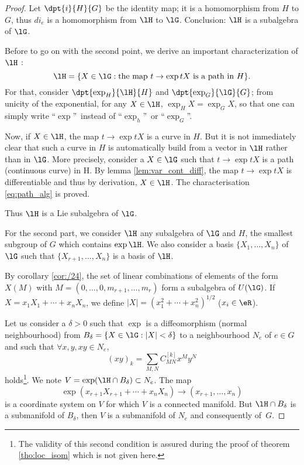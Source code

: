 \begin{proof}

Let $\dpt{i}{H}{G}$ be the identity map; it is a homomorphism from $H$ to $G$, thus $di_e$ is a homomorphism from $\lH$ to $\lG$. Conclusion: $\lH$ is a subalgebra of $\lG$. 

Before to go on with the second point, we derive an important characterization of $\lH$ :
\begin{equation}\label{eq:path_alg}
\lH=\{X\in\lG:\text{the map } t\to\exp tX\text{ is a path in $H$}\}.
\end{equation}
For that, consider $\dpt{\exp_H}{\lH}{H}$ and $\dpt{\exp_G}{\lG}{G}$; from unicity of the exponential, for any $X\in\lH$, $\exp_HX=\exp_GX$, so that one can simply write ``$\exp$''\ instead of ``$\exp_h$''\ or ``$\exp_G$''.

Now, if $X\in\lH$, the map $t\to\exp tX$ is a curve in $H$. But it is not immediately clear that such a curve in $H$ is automatically build from a vector in $\lH$ rather than in $\lG$.  More precisely, consider a $X\in\lG$ such that $t\to\exp tX$ is a path (continuous curve) in H. By lemma \ref{lem:var_cont_diff}, the map $t\to\exp tX$ is differentiable and thus by derivation, $X\in\lH$.
The characterisation \eqref{eq:path_alg} is proved.

Thus $\lH$ is a Lie subalgebra of $\lG$.

For the second part, we consider $\lH$ any subalgebra of $\lG$ and $H$, the smallest subgroup of $G$ which contains $\exp\lH$. We also consider a basis $\{X_1,\ldots,X_n\}$ of $\lG$ such that $\{X_{r+1},\ldots,X_n\}$ is a basis of $\lH$.

By corollary \ref{cor:/24}, the set of linear combinations of elements of the form $X(M)$ with $M=(0,\ldots,0,m_{r+1},\ldots,m_r)$ form a subalgebra of $U(\lG)$. If $X=x_1X_1+\cdots+x_nX_n$, we define $|X|=(x_1^2+\cdots+x_n^2)^{1/2}$ ($x_i\in\eR$).

Let us consider a $\delta>0$ such that $\exp$ is a diffeomorphism (normal neighbourhood) from $B_{\delta}=\{X\in\lG:|X|<\delta\}$ to a neighbourhood $N_e$ of $e\in G$ and such that $\forall x,y,xy\in N_e$,
\begin{equation}\label{eq:coord_xy}
   (xy)_k=\sum_{M,N}C^{[k]}_{MN}x^My^N
\end{equation}
holds\footnote{The validity of this second condition is assured during the proof of theorem \ref{tho:loc_isom} which is not given here.}. We note $V=\exp(\lH\cap B_{\delta})\subset N_e$. The map
\[
   \exp(x_{r+1}X_{r+1}+\cdots+x_nX_n)\to(x_{r+1},\ldots,x_n)
\]
is a coordinate system on $V$ for which $V$ is a connected manifold. But $\lH\cap B_{\delta}$ is a submanifold of $B_{\delta}$, then $V$ is a submanifold of $N_e$ and consequently of~$G$.


\end{proof}
